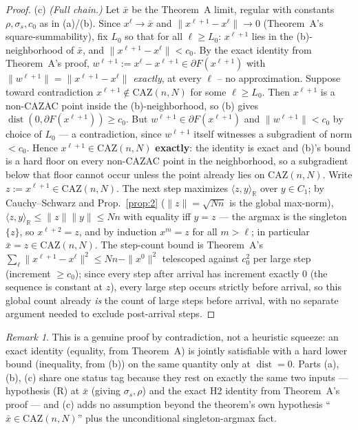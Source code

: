 \documentclass[11pt]{article}
\theoremstyle{plain}
\theoremstyle{definition}
\theoremstyle{remark}
\newtheorem{remark}[theorem]{Remark}
\newcommand{\R}{\mathbb R}
\newcommand{\CAZ}{\mathrm{CAZ}}
\newcommand{\dist}{\operatorname{dist}}
\begin{document}
\begin{proof}
(c) \emph{(Full chain.)} Let $\bar x$ be the Theorem~A limit, regular with
constants $\rho,\sigma_s,c_0$ as in (a)/(b). Since $x^\ell\to\bar x$ and
$\|x^{\ell+1}-x^\ell\|\to0$ (Theorem~A's square-summability), fix $L_0$ so
that for all $\ell\ge L_0$: $x^{\ell+1}$ lies in the (b)-neighborhood of
$\bar x$, and $\|x^{\ell+1}-x^\ell\|<c_0$. By the exact identity from
Theorem~A's proof, $w^{\ell+1}:=x^\ell-x^{\ell+1}\in\partial F(x^{\ell+1})$
with $\|w^{\ell+1}\|=\|x^{\ell+1}-x^\ell\|$ \emph{exactly}, at every $\ell$
-- no approximation. Suppose toward contradiction $x^{\ell+1}\notin\CAZ(n,N)$
for some $\ell\ge L_0$. Then $x^{\ell+1}$ is a non-CAZAC point inside the
(b)-neighborhood, so (b) gives $\dist(0,\partial F(x^{\ell+1}))\ge c_0$. But
$w^{\ell+1}\in\partial F(x^{\ell+1})$ and $\|w^{\ell+1}\|<c_0$ by choice of
$L_0$ --- a contradiction, since $w^{\ell+1}$ itself witnesses a subgradient
of norm $<c_0$. Hence $x^{\ell+1}\in\CAZ(n,N)$ \textbf{exactly}: the
identity is exact and (b)'s bound is a hard floor on every non-CAZAC point
in the neighborhood, so a subgradient below that floor cannot occur unless
the point already lies on $\CAZ(n,N)$. Write $z:=x^{\ell+1}\in\CAZ(n,N)$.
The next step maximizes $\langle z,y\rangle_\R$ over $y\in C_1$; by
Cauchy--Schwarz and Prop.~\ref{prop:2} ($\|z\|=\sqrt{Nn}$ is the global
max-norm), $\langle z,y\rangle_\R\le\|z\|\|y\|\le Nn$ with equality iff
$y=z$ --- the argmax is the singleton $\{z\}$, so $x^{\ell+2}=z$, and by
induction $x^m=z$ for all $m>\ell$; in particular $\bar x=z\in\CAZ(n,N)$.
The step-count bound is Theorem~A's
$\sum_\ell\|x^{\ell+1}-x^\ell\|^2\le Nn-\|x^0\|^2$ telescoped against
$c_0^2$ per large step (increment $\ge c_0$); since every step after
arrival has increment exactly $0$ (the sequence is constant at $z$), every
large step occurs strictly before arrival, so this global count already
\emph{is} the count of large steps before arrival, with no separate
argument needed to exclude post-arrival steps.
\end{proof}

\begin{remark}
This is a genuine proof by contradiction, not a heuristic squeeze: an
exact identity (equality, from Theorem~A) is jointly satisfiable with a
hard lower bound (inequality, from (b)) on the same quantity only at
$\dist=0$. Parts (a), (b), (c) share one status tag because they rest on
exactly the same two inputs --- hypothesis (R) at $\bar x$ (giving
$\sigma_s,\rho$) and the exact H2 identity from Theorem~A's proof --- and
(c) adds no assumption beyond the theorem's own hypothesis
``$\bar x\in\CAZ(n,N)$'' plus the unconditional singleton-argmax fact.
\end{remark}
\end{document}
